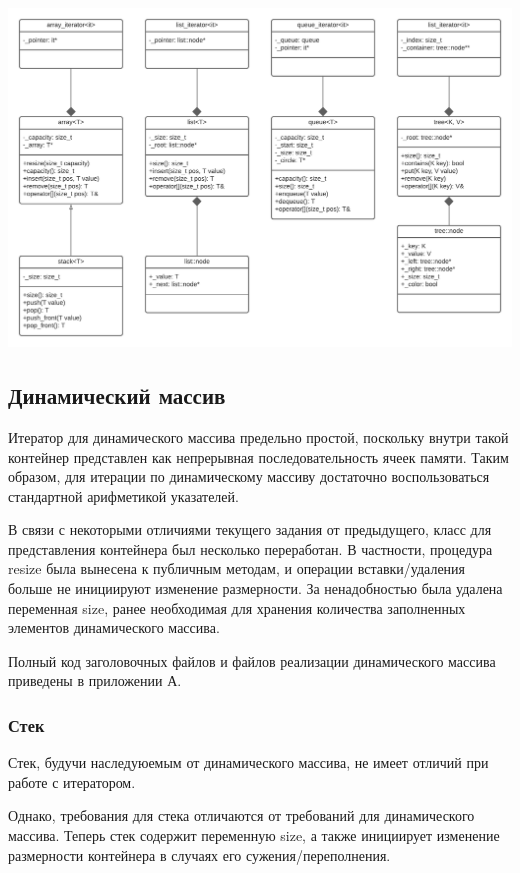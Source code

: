\documentclass[a4paper,12pt]{article}
\begin{document}
\includegraphics[width=\textwidth]{UML Class.pdf}

\label{Class}

\cleardoublepage

\subsection{Динамический массив}

Итератор для динамического массива предельно простой, поскольку внутри такой контейнер представлен как непрерывная последовательность ячеек памяти.
Таким образом, для итерации по динамическому массиву достаточно воспользоваться стандартной арифметикой указателей.

В связи с некоторыми отличиями текущего задания от предыдущего, класс для представления контейнера был несколько переработан.
В частности, процедура resize была вынесена к публичным методам, и операции вставки/удаления больше не инициируют изменение размерности. За ненадобностью была удалена переменная size, ранее необходимая для хранения количества заполненных элементов динамического массива.

Полный код заголовочных файлов и файлов реализации динамического массива приведены в приложении А.

\subsubsection{Стек}

Стек, будучи наследуюемым от динамического массива, не имеет отличий при работе с итератором.

Однако, требования для стека отличаются от требований для динамического массива. Теперь стек содержит переменную size, а также инициирует изменение размерности контейнера в случаях его сужения/переполнения.
\end{document}
